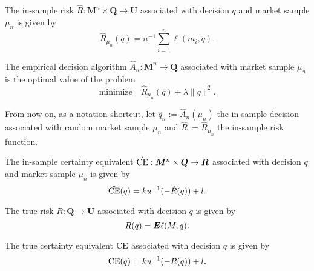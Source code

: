 \documentclass[10pt]{article}
\begin{document}
\begin{deff}
  The in-sample risk $\hat R: \bm M^n\times \bm Q \to \bm U$ associated with decision $q$
  and market sample $\mu_n$ is given by
  \[
    \hat R_{\mu_n}(q) = n^{-1} \sum_{i=1}^n \ell(m_i,q).
  \]
\end{deff}

\begin{deff}
  The empirical decision algorithm $\hat A_n:\bm M^n \to \bm Q$ associated with
  market sample $\mu_n$ is the optimal value of the problem
  \[
    \text{minimize}\quad\hat R_{\mu_n}(q) + \lambda\|q\|^2.
  \]
\end{deff}

From now on, as a notation shortcut, let $\hat q_n := \hat A_n(\mu_n)$ the in-sample
decision associated with random market sample $\mu_n$ and $\hat R:=\hat R_{\mu_n}$ the
in-sample risk function.

\begin{deff}
  The in-sample certainty equivalent $\hat{\operatorname{CE}}:\bm M^n\times\bm Q\to\bm R$ associated with
  decision $q$ and market sample $\mu_n$ is given by
  \[
    \hat{\operatorname{CE}}(q) = ku^{-1}(-\hat R(q)) + l.
  \]
\end{deff}


\begin{deff}
  The true risk $R:\bm Q\to\bm U$ associated with decision $q$ is given by
  \[
    R(q) = \bm E\ell(M,q).
  \]
\end{deff}




\begin{deff}
  The true certainty equivalent $\operatorname{CE}$ associated with decision $q$ is given by
  \[
    \operatorname{CE}(q) = ku^{-1}(-R(q)) + l.
  \]
\end{deff}
\end{document}
